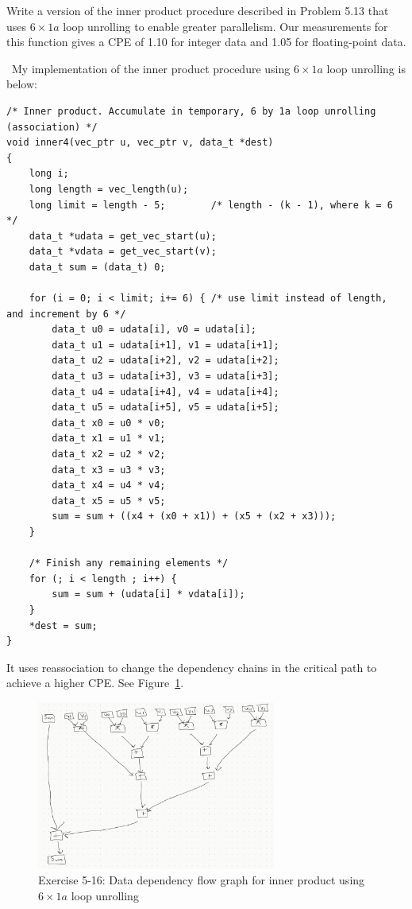 \documentclass[12pt]{article}
\newenvironment{ex}[2][Exercise]{\begin{trivlist}
		\item[\hskip \labelsep {\bfseries #1}\hskip \labelsep {\bfseries #2.}]}{\end{trivlist}}
\newenvironment{sol}[1][Solution]{\begin{trivlist}
		\item[\hskip \labelsep {\bfseries #1:}]}{\end{trivlist}}
\begin{document}
\begin{ex}{5.16}
	Write a version of the inner product procedure described in Problem 5.13 that uses
	$6\times 1a$ loop unrolling to enable greater parallelism. Our measurements for this
	function gives a CPE of 1.10 for integer data and 1.05 for floating-point data.
\end{ex}

\begin{sol}
	\
	My implementation of the inner product procedure using $6\times 1a$ loop unrolling is below:
	\begin{lstlisting}
/* Inner product. Accumulate in temporary, 6 by 1a loop unrolling (association) */
void inner4(vec_ptr u, vec_ptr v, data_t *dest)
{
	long i;
	long length = vec_length(u);
	long limit = length - 5; 		/* length - (k - 1), where k = 6 */
	data_t *udata = get_vec_start(u);
	data_t *vdata = get_vec_start(v);
	data_t sum = (data_t) 0;
	
	for (i = 0; i < limit; i+= 6) {	/* use limit instead of length, and increment by 6 */
		data_t u0 = udata[i], v0 = udata[i];
		data_t u1 = udata[i+1], v1 = udata[i+1];
		data_t u2 = udata[i+2], v2 = udata[i+2];
		data_t u3 = udata[i+3], v3 = udata[i+3];
		data_t u4 = udata[i+4], v4 = udata[i+4];
		data_t u5 = udata[i+5], v5 = udata[i+5];
		data_t x0 = u0 * v0;
		data_t x1 = u1 * v1;
		data_t x2 = u2 * v2;
		data_t x3 = u3 * v3;
		data_t x4 = u4 * v4;
		data_t x5 = u5 * v5;
		sum = sum + ((x4 + (x0 + x1)) + (x5 + (x2 + x3)));
	}
	
	/* Finish any remaining elements */
	for (; i < length ; i++) {
		sum = sum + (udata[i] * vdata[i]);
	}
	*dest = sum;
}
	\end{lstlisting}
	It uses reassociation to change the dependency chains in the critical path to achieve
	a higher CPE. See Figure~\ref{fig:ex-05-16}.
	\begin{figure}
		\centering
		\includegraphics[width=0.7\textwidth]{exercise-05-16}
		\caption{Exercise 5-16: Data dependency flow graph for inner product using
			$6\times 1a$ loop unrolling}
		\label{fig:ex-05-16}
	\end{figure}
\end{sol}
\end{document}

